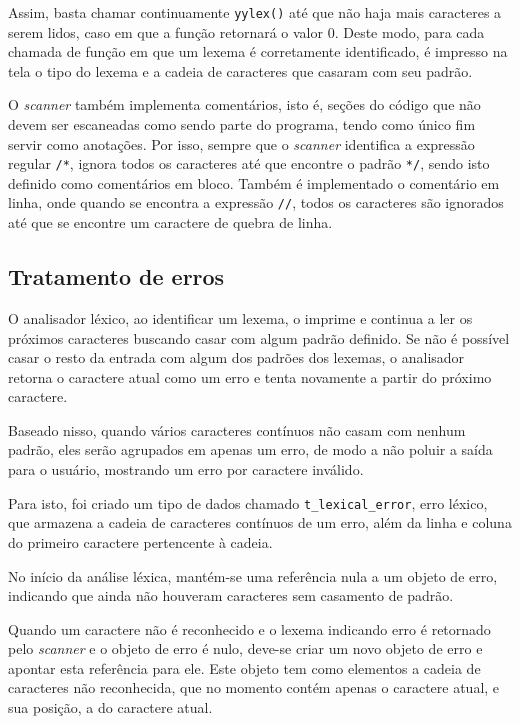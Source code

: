 \documentclass[
	article,			%
	11pt,				%
	oneside,			%
	a4paper,			%
	english,			%
	brazil,				%
	sumario=tradicional
	]{abntex2}
\begin{document}
Assim, basta chamar continuamente \texttt{yylex()} até que não
haja mais caracteres a serem lidos, caso em que a função retornará
o valor 0. Deste modo, para cada chamada de função em que um lexema
é corretamente identificado, é impresso na tela o tipo do lexema
e a cadeia de caracteres que casaram com seu padrão.

O \textit{scanner} também implementa comentários, isto é, seções do código
que não devem ser escaneadas como sendo parte do programa, tendo
como único fim servir como anotações. Por isso, sempre que o
\textit{scanner} identifica a expressão regular \texttt{/*}, ignora todos
os caracteres até que encontre o padrão \texttt{*/}, sendo isto
definido como comentários em bloco. Também é implementado o comentário
em linha, onde quando se encontra a expressão \texttt{//}, todos
os caracteres são ignorados até que se encontre um caractere
de quebra de linha.

\subsection{Tratamento de erros}

O analisador léxico, ao identificar um lexema, o imprime e
continua a ler os próximos caracteres buscando casar com algum
padrão definido. Se não é possível casar o resto da entrada com
algum dos padrões dos lexemas, o analisador retorna o caractere
atual como um erro e tenta novamente a partir do próximo caractere.

Baseado nisso, quando vários caracteres contínuos não casam com
nenhum padrão, eles serão agrupados em apenas um erro, de modo 
a não poluir a saída para o usuário, mostrando um erro por caractere
inválido.

Para isto, foi criado um tipo de dados chamado \texttt{t_lexical_error},
erro léxico, que armazena a cadeia de caracteres contínuos de um erro,
além da linha e coluna do primeiro caractere pertencente à cadeia.

No início da análise léxica, mantém-se uma referência nula a um
objeto de erro, indicando que ainda não houveram caracteres sem
casamento de padrão.

Quando um caractere não é reconhecido e o lexema indicando erro é retornado
pelo \textit{scanner} e o objeto de erro é nulo, deve-se criar um novo
objeto de erro e apontar esta referência para ele. Este objeto tem como
elementos a cadeia de caracteres não reconhecida, que no momento
contém apenas o caractere atual, e sua posição, a do caractere atual. 
\end{document}
